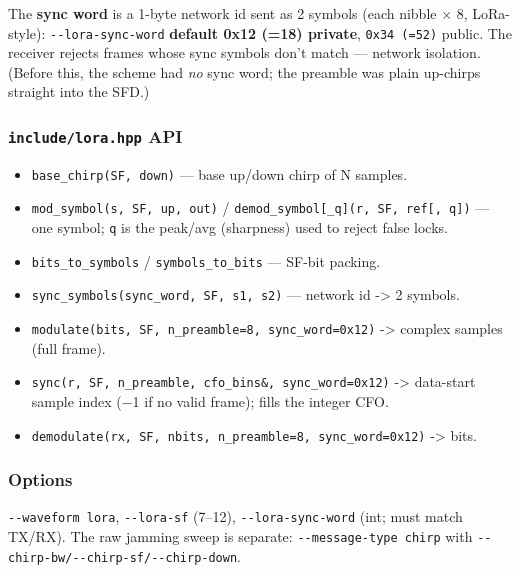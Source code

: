 \documentclass[
  10pt,
]{article}
\providecommand{\tightlist}{%
  \setlength{\itemsep}{0pt}\setlength{\parskip}{0pt}}
\begin{document}
The \textbf{sync word} is a 1-byte network id sent as 2 symbols (each
nibble × 8, LoRa-style): \texttt{-\/-lora-sync-word} \textbf{default
0x12 (=18) private}, \texttt{0x34\ (=52)} public. The receiver rejects
frames whose sync symbols don't match --- network isolation. (Before
this, the scheme had \emph{no} sync word; the preamble was plain
up-chirps straight into the SFD.)

\hypertarget{includelorahpp-api}{%
\subsubsection{\texorpdfstring{\texttt{include/lora.hpp}
API}{include/lora.hpp API}}\label{includelorahpp-api}}

\begin{itemize}
\tightlist
\item
  \texttt{base\_chirp(SF,\ down)} --- base up/down chirp of N samples.
\item
  \texttt{mod\_symbol(s,\ SF,\ up,\ out)} /
  \texttt{demod\_symbol{[}\_q{]}(r,\ SF,\ ref{[},\ q{]})} --- one
  symbol; \texttt{q} is the peak/avg (sharpness) used to reject false
  locks.
\item
  \texttt{bits\_to\_symbols} / \texttt{symbols\_to\_bits} --- SF-bit
  packing.
\item
  \texttt{sync\_symbols(sync\_word,\ SF,\ s1,\ s2)} --- network id
  -\textgreater{} 2 symbols.
\item
  \texttt{modulate(bits,\ SF,\ n\_preamble=8,\ sync\_word=0x12)}
  -\textgreater{} complex samples (full frame).
\item
  \texttt{sync(r,\ SF,\ n\_preamble,\ cfo\_bins\&,\ sync\_word=0x12)}
  -\textgreater{} data-start sample index (−1 if no valid frame); fills
  the integer CFO.
\item
  \texttt{demodulate(rx,\ SF,\ nbits,\ n\_preamble=8,\ sync\_word=0x12)}
  -\textgreater{} bits.
\end{itemize}

\hypertarget{options}{%
\subsubsection{Options}\label{options}}

\texttt{-\/-waveform\ lora}, \texttt{-\/-lora-sf} (7--12),
\texttt{-\/-lora-sync-word} (int; must match TX/RX). The raw jamming
sweep is separate: \texttt{-\/-message-type\ chirp} with
\texttt{-\/-chirp-bw/-\/-chirp-sf/-\/-chirp-down}.
\end{document}
